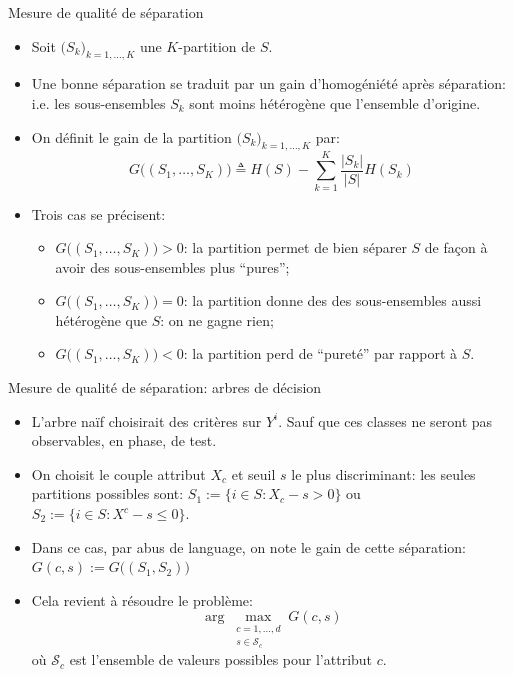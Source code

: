 \documentclass[8pt]{beamer}
\begin{document}
			\begin{frame}{Mesure de qualité de séparation}
				\begin{itemize}
					\item<1-> Soit \(\big(S_k\big)_{k = 1, \dots, K}\) une \(K\)-partition de \(S\).
					\item<2-> Une bonne séparation se traduit par un gain d'homogéniété après séparation: i.e. les sous-ensembles \(S_k\) sont moins hétérogène que l'ensemble d'origine.
					\item<3-> On définit le gain de la partition \(\big(S_k\big)_{k = 1, \dots, K}\) par:
						\begin{equation}
							G\big((S_1, \dots, S_K)\big) \triangleq H(S) - \sum_{k=1}^K \frac{\vert S_k \vert}{\vert S \vert}H(S_k)
						\end{equation}
					\item<4-> Trois cas se précisent:
						\begin{itemize}
							\item<5-> \(G\big((S_1, \dots, S_K)\big) > 0\): la partition permet de bien séparer \(S\) de façon à avoir des sous-ensembles plus ``pures'';
							\item<6-> \(G\big((S_1, \dots, S_K)\big) = 0\): la partition donne des des sous-ensembles aussi hétérogène que \(S\): on ne gagne rien;
							\item<7-> \(G\big((S_1, \dots, S_K)\big) < 0\): la partition perd de ``pureté'' par rapport à \(S\).
						\end{itemize}
				\end{itemize}
			\end{frame}
			\begin{frame}{Mesure de qualité de séparation: arbres de décision}
				\begin{itemize}
					\item<1-> L'arbre naïf choisirait des critères sur \(Y^i\). Sauf que ces classes ne seront pas observables, en phase, de test.
					\item<2-> On choisit le couple attribut \(X_c\) et seuil \(s\) le plus discriminant: les seules partitions possibles sont: \(S_1 := \{i \in S: X_c - s > 0\}\) ou \(S_2 := \{i \in S: X^c - s \leq 0\}\).
					\item<3-> Dans ce cas, par abus de language, on note le gain de cette séparation: \(G(c, s) := G\big((S_1, S_2)\big)\)
					\item<4-> Cela revient à résoudre le problème:
						\begin{equation}
							\arg \max_{\substack{c=1,\dots,d\\s \in \mathscr{S}_c}} G(c, s)
						\end{equation}
						où \(\mathscr{S}_c\) est l'ensemble de valeurs possibles pour l'attribut \(c\).
				\end{itemize}
			\end{frame}
\end{document}
